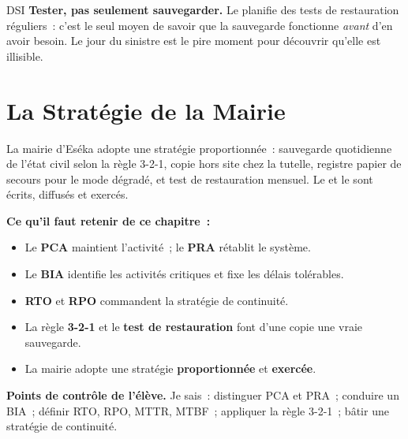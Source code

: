 \begin{boxmetier}{DSI}
\textbf{Tester, pas seulement sauvegarder.} Le  planifie des tests
de restauration réguliers~: c'est le seul moyen de savoir que la sauvegarde
fonctionne \emph{avant} d'en avoir besoin. Le jour du sinistre est le pire
moment pour découvrir qu'elle est illisible.
\end{boxmetier}

\section{La Stratégie de la Mairie}
\label{sec:c17-strategie}

La mairie d'Eséka adopte une stratégie proportionnée~: sauvegarde quotidienne
de l'état civil selon la règle 3-2-1, copie hors site chez la tutelle, registre
papier de secours pour le mode dégradé, et test de restauration mensuel. Le
 et le  sont écrits, diffusés et exercés.

\separateur

\begin{boxresume}
\textbf{Ce qu'il faut retenir de ce chapitre~:}
\begin{itemize}
    \item Le \textbf{PCA} maintient l'activité~; le \textbf{PRA} rétablit le
          système.
    \item Le \textbf{BIA} identifie les activités critiques et fixe les délais
          tolérables.
    \item \textbf{RTO} et \textbf{RPO} commandent la stratégie de continuité.
    \item La règle \textbf{3-2-1} et le \textbf{test de restauration} font
          d'une copie une vraie sauvegarde.
    \item La mairie adopte une stratégie \textbf{proportionnée} et
          \textbf{exercée}.
\end{itemize}
\end{boxresume}

\begin{boxinfo}
\textbf{Points de contrôle de l'élève.} Je sais~: distinguer PCA et PRA~;
conduire un BIA~; définir RTO, RPO, MTTR, MTBF~; appliquer la règle 3-2-1~;
bâtir une stratégie de continuité.
\end{boxinfo}

\bigskip

